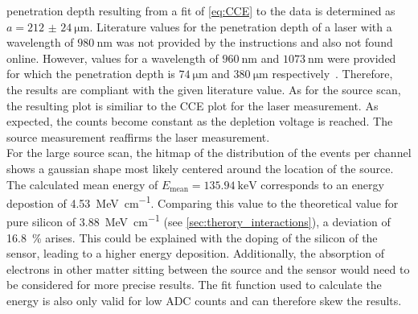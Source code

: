 penetration depth resulting from a fit of \autoref{eq:CCE} to the data is determined as $a = \qty{212(24)}{\micro\metre}$.
Literature values for the penetration depth of a laser with a wavelength of $\qty{980}{\nano\metre}$ was not provided
by the instructions and also not found online. However, values for a wavelength of $\qty{960}{\nano\metre}$ and $\qty{1073}{\nano\metre}$
were provided for which the penetration depth is $\qty{74}{\micro\metre}$ and $\qty{380}{\micro\metre}$ respectively~\cite{SiliconStrip}. Therefore,
the results are compliant with the given literature value. As for the source scan, the resulting plot is similiar 
to the CCE plot for the laser measurement. As expected, the counts become constant as the depletion voltage is reached.
The source measurement reaffirms the laser measurement.\\
For the large source scan, the hitmap of the distribution of the events per channel shows a gaussian shape most likely centered around the location of the source.
The calculated mean energy of $E_{\mathrm{mean}} = \qty{135.94}{\kilo\electronvolt}$ corresponds to an energy depostion of \qty{4.53}{\mega\electronvolt\per\centi\metre}.
Comparing this value to the theoretical value for pure silicon of \qty{3.88}{\mega\electronvolt\per\centi\metre} (see \ref{sec:therory_interactions}), a deviation of \qty{16.8}{\percent} arises.
This could be explained with the doping of the silicon of the sensor, leading to a higher energy deposition. Additionally, the absorption of electrons in other 
matter sitting between the source and the sensor would need to be considered for more precise results. The fit function used to calculate the energy is also only 
valid for low ADC counts and can therefore skew the results.
